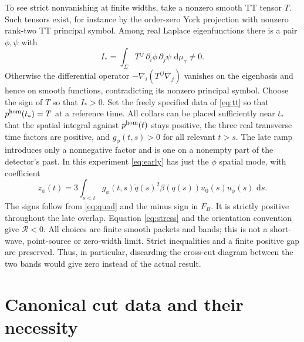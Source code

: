 \documentclass[11pt]{article}
\newcommand{\dd}{\,\mathrm d}
\numberwithin{equation}{section}
\begin{document}
To see strict nonvanishing at finite widths, take a nonzero smooth TT tensor $T$. Such tensors exist, for instance by the order-zero York projection with nonzero rank-two TT principal symbol. Among real Laplace eigenfunctions there is a pair $\phi,\psi$ with
\begin{equation}
        I_*=\int_\Sigma T^{ij}\,\partial_i\phi\,\partial_j\psi
                                         \,\dd\mu_\gamma \ne 0 .
 \label{eq:eigen}
\end{equation}
Otherwise the differential operator $-\nabla_i(T^{ij}\nabla_j)$ vanishes on the eigenbasis and hence on smooth functions, contradicting its nonzero principal symbol. Choose the sign of $T$ so that $I_*>0$. Set the freely specified data of \eqref{eq:tt} so that $p^{\rm hom}(t_*)=T$ at a reference time. All collars can be placed sufficiently near $t_*$ that the spatial integral against $p^{\rm hom}(t)$ stays positive, the three real transverse time factors are positive, and $g_\phi(t,s)>0$ for all relevant $t>s$. The late ramp introduces only a nonnegative factor and is one on a nonempty part of the detector's past. In this experiment \eqref{eq:early} has just the $\phi$ spatial mode, with coefficient
\begin{equation}
 z_\phi(t)=3\int_{s<t} g_\phi(t,s)\dot q(s)^2\beta(q(s))u_0(s)u_\phi(s)\,\dd s .
 \label{eq:z}
\end{equation}
The signs follow from \eqref{eq:quad} and the minus sign in $F_B$. It is strictly positive throughout the late overlap. Equation \eqref{eq:stress} and the orientation convention give $\mathcal R<0$. All choices are finite smooth packets and bands; this is not a short-wave, point-source or zero-width limit. Strict inequalities and a finite positive gap are preserved. Thus, in particular, discarding the cross-cut diagram between the two bands would give zero instead of the actual result.

\section{Canonical cut data and their necessity}\label{sec:cut}
\end{document}

